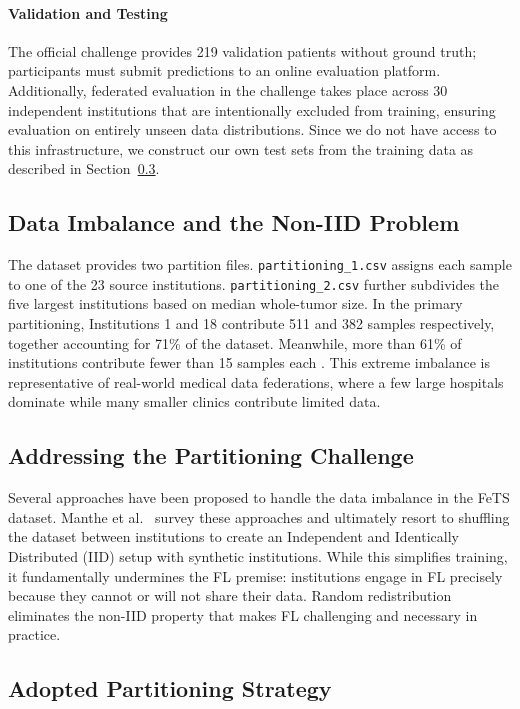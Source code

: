 \documentclass{article}
\begin{document}
\paragraph{Validation and Testing} The official challenge provides 219 validation patients without ground truth; participants must submit predictions to an online evaluation platform. Additionally, federated evaluation in the challenge takes place across 30 independent institutions that are intentionally excluded from training, ensuring evaluation on entirely unseen data distributions. Since we do not have access to this infrastructure, we construct our own test sets from the training data as described in Section~\ref{sec:split}.

\subsection{Data Imbalance and the Non-IID Problem}

The dataset provides two partition files. \texttt{partitioning\_1.csv} assigns each sample to one of the 23 source institutions. \texttt{partitioning\_2.csv} further subdivides the five largest institutions based on median whole-tumor size. In the primary partitioning, Institutions 1 and 18 contribute 511 and 382 samples respectively, together accounting for 71\% of the dataset. Meanwhile, more than 61\% of institutions contribute fewer than 15 samples each \cite{manthe_federated_2024}. This extreme imbalance is representative of real-world medical data federations, where a few large hospitals dominate while many smaller clinics contribute limited data.

\subsection{Addressing the Partitioning Challenge}

Several approaches have been proposed to handle the data imbalance in the FeTS dataset. Manthe et al.\ \cite{manthe_federated_2024} survey these approaches and ultimately resort to shuffling the dataset between institutions to create an Independent and Identically Distributed (IID) setup with synthetic institutions. While this simplifies training, it fundamentally undermines the FL premise: institutions engage in FL precisely because they cannot or will not share their data. Random redistribution eliminates the non-IID property that makes FL challenging and necessary in practice.

\subsection{Adopted Partitioning Strategy}
\label{sec:split}
\end{document}
